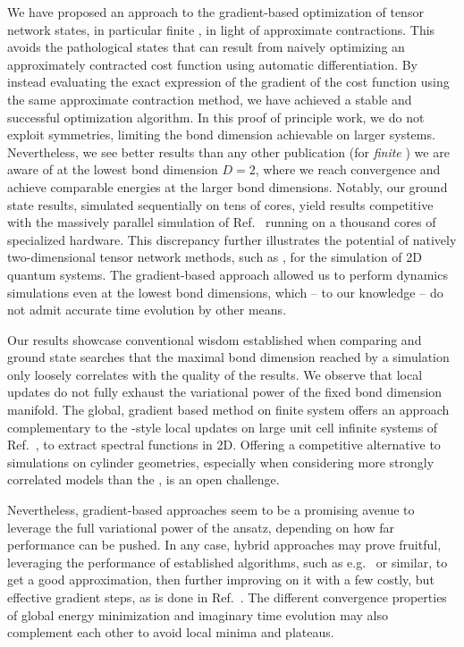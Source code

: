 We have proposed an approach to the gradient-based optimization of tensor network states, in particular finite , in light of approximate contractions.
%
This avoids the pathological states that can result from naively optimizing an approximately contracted cost function using automatic differentiation.
%
By instead evaluating the exact expression of the gradient of the cost function using the same approximate contraction method, we have achieved a stable and successful optimization algorithm.
%
In this proof of principle work, we do not exploit symmetries, limiting the bond dimension achievable on larger systems.
%
Nevertheless, we see better results than any other publication (for \emph{finite} ) we are aware of at the lowest bond dimension $D=2$, where we reach convergence and achieve comparable energies at the larger bond dimensions.
%
Notably, our ground state results, simulated sequentially on tens of  cores, yield results competitive with the massively parallel  simulation of Ref.~\cite{ganahl2023} running on a thousand cores of specialized  hardware.
%
This discrepancy further illustrates the potential of natively two-dimensional tensor network methods, such as , for the simulation of 2D quantum systems.
%
The gradient-based approach allowed us to perform dynamics simulations even at the lowest bond dimensions, which -- to our knowledge -- do not admit accurate time evolution by other means.



Our results showcase conventional wisdom established when comparing  and  ground state searches that the maximal bond dimension reached by a  simulation only loosely correlates with the quality of the results.
%
We observe that local updates do not fully exhaust the variational power of the fixed bond dimension manifold.
%
The global, gradient based method on finite system offers an approach complementary to the -style local updates on large unit cell infinite systems of Ref.~\cite{espinoza2024}, to extract spectral functions in 2D.
%
Offering a competitive alternative to  simulations on cylinder geometries, especially when considering more strongly correlated models than the , is an open challenge.



Nevertheless, gradient-based approaches seem to be a promising avenue to leverage the full variational power of the  ansatz, depending on how far performance can be pushed.
%
In any case, hybrid approaches may prove fruitful, leveraging the performance of established algorithms, such as e.g.~ or similar, to get a good approximation, then further improving on it with a few costly, but effective gradient steps, as is done in Ref.~\cite{scheb2023}.
%
The different convergence properties of global energy minimization and imaginary time evolution may also complement each other to avoid local minima and plateaus.


